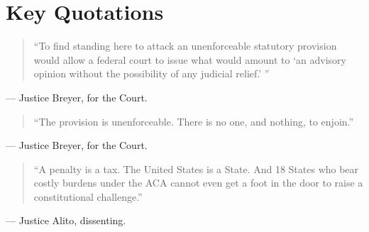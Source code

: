 \documentclass[12pt]{article}
\begin{document}
\section{Key Quotations}

\begin{quote}
``To find standing here to attack an unenforceable statutory provision would allow a federal court to issue what would amount to `an advisory opinion without the possibility of any judicial relief.' ''
\end{quote}
\noindent --- Justice Breyer, for the Court.

\begin{quote}
``The provision is unenforceable. There is no one, and nothing, to enjoin.''
\end{quote}
\noindent --- Justice Breyer, for the Court.

\begin{quote}
``A penalty is a tax. The United States is a State. And 18 States who bear costly burdens under the ACA cannot even get a foot in the door to raise a constitutional challenge.''
\end{quote}
\noindent --- Justice Alito, dissenting.
\end{document}
